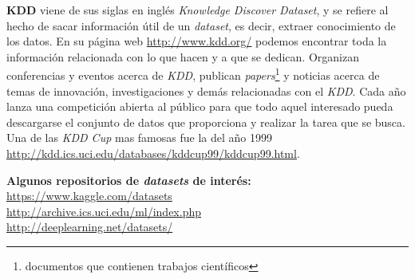 \vspace*{1cm}

\noindent\textbf{KDD} viene de sus siglas en inglés \textit{Knowledge Discover Dataset}, y se refiere al hecho 
de sacar información útil de un \textit{dataset}, es decir, extraer conocimiento de los datos.
En su página web \url{http://www.kdd.org/} podemos encontrar toda la información relacionada con lo 
que hacen y a que se dedican. Organizan conferencias y eventos acerca de \textit{KDD}, 
publican \textit{papers}\footnote{documentos que contienen trabajos científicos}
y noticias acerca de temas de innovación, investigaciones y demás relacionadas con el \textit{KDD}.
Cada año lanza una competición abierta al público para que todo aquel interesado pueda descargarse 
el conjunto de datos que proporciona y realizar la tarea que se busca. Una de las \textit{KDD Cup} mas famosas 
fue la del año 1999 \url{http://kdd.ics.uci.edu/databases/kddcup99/kddcup99.html}.
\newline

\vfill

\noindent \textbf{Algunos repositorios de \textit{datasets} de interés:}\\
\url{https://www.kaggle.com/datasets}\\
\url{http://archive.ics.uci.edu/ml/index.php}\\
\url{http://deeplearning.net/datasets/}\\


